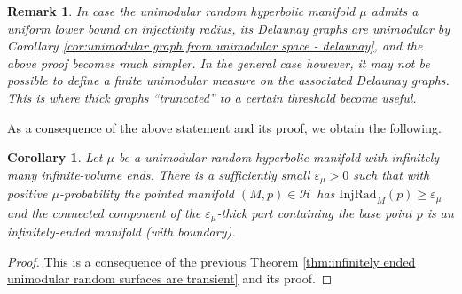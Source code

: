 \documentclass{amsart}
\newcommand{\Hypers}{\mathcal{H}}
\newcommand{\DelanGraph}{\mathcal{DG}}
\theoremstyle{plain}
\newtheorem{remark}[theorem]{Remark}
\newtheorem{cor}[theorem]{Corollary}
\numberwithin{equation}{section}
\theoremstyle{definition}
\begin{document}




\begin{remark}
In case the unimodular random hyperbolic manifold $\mu$ admits a uniform lower bound on injectivity radius,  its Delaunay graphs are unimodular by Corollary \ref{cor:unimodular graph from unimodular space - delaunay}, and the above proof becomes much simpler. In the general case however, it may not be possible to define a \emph{finite} unimodular measure on the associated Delaunay graphs. This is where thick graphs \enquote{truncated} to a certain threshold become  useful.
\end{remark}

As a consequence of the above statement and its proof, we  obtain the following.

\begin{cor}
\label{cor:thick part is infinitely ended}
Let $\mu$ be a unimodular random hyperbolic manifold with infinitely many infinite-volume ends. There is a sufficiently small  $\varepsilon_\mu > 0$ such that with positive  $\mu$-probability the pointed manifold $(M,p) \in \Hypers$ has $\mathrm{InjRad}_M(p) \ge \varepsilon_\mu$ and  the connected component of the $\varepsilon_\mu$-thick part containing the base point $p$ is an infinitely-ended manifold (with boundary).
\end{cor}
\begin{proof}
This is a consequence of the previous Theorem    \ref{thm:infinitely ended unimodular random surfaces are transient} and its proof.
\end{proof}
\end{document}
